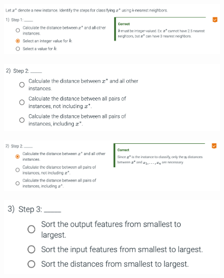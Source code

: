 \documentclass[8pt,dvipsnames]{beamer}
\begin{document}
\begin{frame}
	\begin{figure}[ht]
		\centering
		\includegraphics[width=\linewidth]{imgs/knn_15.png}
	\end{figure}
\end{frame}
\begin{frame}
	\begin{figure}[ht]
		\centering
		\includegraphics[width=\linewidth]{imgs/knn_16.png}
	\end{figure}
\end{frame}

\begin{frame}
	\begin{figure}[ht]
		\centering
		\includegraphics[width=\linewidth]{imgs/knn_17.png}
	\end{figure}
\end{frame}

\begin{frame}
	\begin{figure}[ht]
		\centering
		\includegraphics[scale=0.5]{imgs/knn_18.png}
	\end{figure}
\end{frame}
\end{document}
